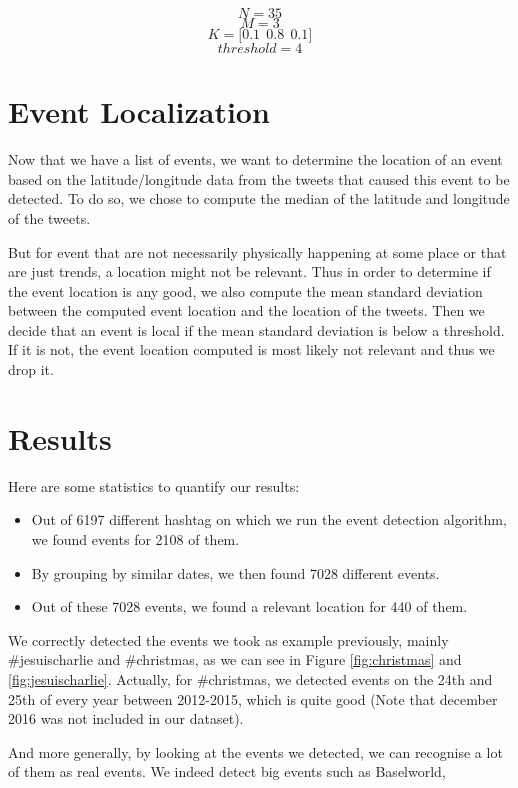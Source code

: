 \documentclass[11pt]{article}
\begin{document}
$$N = 35 $$
$$M = 3$$
$$K = \big[ 0.1\ \ 0.8\ \ 0.1 \big]$$
$$threshold = 4$$

\section{Event Localization}
Now that we have a list of events, we want to determine the location of an event based on the latitude/longitude data from the tweets that caused this event to be detected. To do so, we chose to compute the median of the latitude and longitude of the tweets. 

But for event that are not necessarily physically happening at some place or that are just trends, a location might not be relevant. Thus in order to determine if the event location is any good, we also compute the mean standard deviation between the computed event location and the location of the tweets. Then we decide that an event is local if the mean standard deviation is below a threshold. If it is not, the event location computed is most likely not relevant and thus we drop it.

\section{Results}
Here are some statistics to quantify our results:

\begin{itemize}
  \item Out of 6197 different hashtag on which we run the event detection algorithm, we found events for 2108 of them.
  \item By grouping by similar dates, we then found 7028 different events.
  \item Out of these 7028 events, we found a relevant location for 440 of them.
\end{itemize}

We correctly detected the events we took as example previously, mainly \#jesuischarlie and \#christmas, as we can see in Figure \ref{fig:christmas} and \ref{fig:jesuischarlie}. Actually, for \#christmas, we detected events on the 24th and 25th of every year between 2012-2015, which is quite good (Note that december 2016 was not included in our dataset).

And more generally, by looking at the events we detected, we can recognise a lot of them as real events. We indeed detect big events such as Baselworld, 
\end{document}
